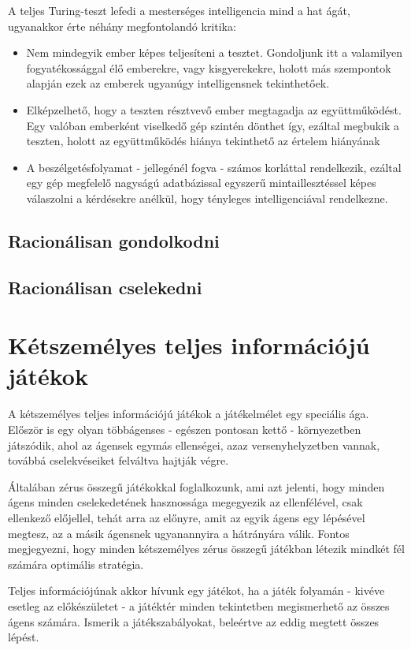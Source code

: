 A teljes Turing-teszt lefedi a mesterséges intelligencia mind a hat ágát, ugyanakkor érte néhány megfontolandó kritika:
\begin{itemize}
	\item Nem mindegyik ember képes teljesíteni a tesztet. Gondoljunk itt a valamilyen fogyatékossággal élő emberekre, vagy kisgyerekekre, holott más szempontok alapján ezek az emberek ugyanúgy intelligensnek tekinthetőek.
	\item Elképzelhető, hogy a teszten résztvevő ember megtagadja az együttműködést. Egy valóban emberként viselkedő gép szintén dönthet így, ezáltal megbukik a teszten, holott az együttműködés hiánya tekinthető az értelem hiányának
	\item A beszélgetésfolyamat - jellegénél fogva - számos korláttal rendelkezik, ezáltal egy gép megfelelő nagyságú adatbázissal egyszerű mintaillesztéssel képes válaszolni a kérdésekre anélkül, hogy tényleges intelligenciával rendelkezne. 
\end{itemize}

\subsection{Racionálisan gondolkodni}
\subsection{Racionálisan cselekedni}

\section{Kétszemélyes teljes információjú játékok}
A kétszemélyes teljes információjú játékok a játékelmélet egy speciális ága. Először is egy olyan többágenses - egészen pontosan kettő - környezetben játszódik, ahol az ágensek egymás ellenségei, azaz versenyhelyzetben vannak, továbbá cselekvéseiket felváltva hajtják végre.\ujsor

Általában zérus összegű játékokkal foglalkozunk, ami azt jelenti, hogy minden ágens minden cselekedetének hasznossága megegyezik az ellenfélével, csak ellenkező előjellel, tehát arra az előnyre, amit az egyik ágens egy lépésével megtesz, az a másik ágensnek ugyanannyira a hátrányára válik. Fontos megjegyezni, hogy minden kétszemélyes zérus összegű játékban létezik mindkét fél számára optimális stratégia.\ujsor

Teljes információjúnak akkor hívunk egy játékot, ha a játék folyamán - kivéve esetleg az előkészületet - a játéktér minden tekintetben megismerhető az összes ágens számára. Ismerik a játékszabályokat, beleértve az eddig megtett összes lépést.\ujsor


